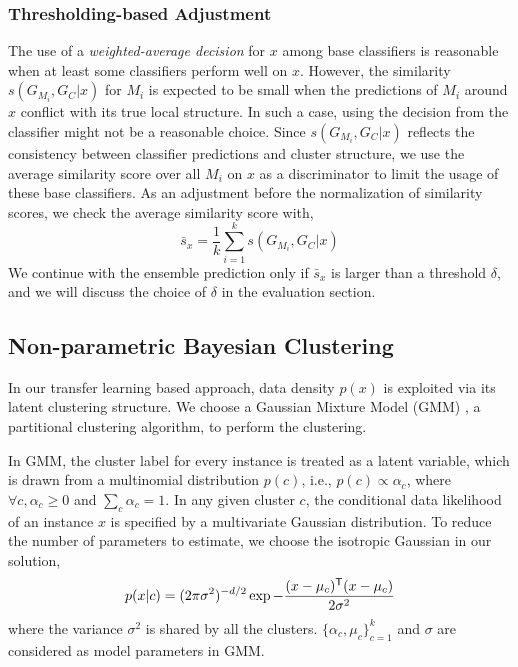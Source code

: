 \subsubsection{Thresholding-based Adjustment}
The use of a \emph{weighted-average decision} for $x$ among base classifiers is reasonable when at least some classifiers perform well on $x$.
However, the similarity $s(G_{M_i}, G_C|x)$ for $M_i$ is expected to be small when the predictions of $M_i$ around $x$ conflict with its true local structure.
In such a case, using the decision from the classifier might not be a reasonable choice.
Since $s(G_{M_i}, G_C|x)$ reflects the consistency between classifier predictions and cluster structure, we use the average similarity score over all $M_i$ on $x$ as a discriminator to limit the usage of these base classifiers.
As an adjustment before the normalization of similarity scores, we check the average similarity score with,
\begin{equation}\label{ave_sim}
 \bar s_x = \frac {1}{k}\sum_{i=1}^k s(G_{M_i}, G_C|x)
\end{equation}
We continue with the ensemble prediction only if $\bar s_x$ is larger than a threshold $\delta$, and we will discuss the choice of $\delta$ in the evaluation section.


\subsection{Non-parametric Bayesian Clustering}
\label{sec_clustering}
In our transfer learning based approach, data density $p(x)$ is exploited via its latent clustering structure. We choose a Gaussian Mixture Model (GMM) \cite{zivkovic2004improved}, a partitional clustering algorithm, to perform the clustering.

In GMM, the cluster label for every instance is treated as a latent variable, which is drawn from a multinomial distribution $p(c)$, i.e., $p(c)\propto\alpha_c$, where $\forall c, \alpha_c\ge0$ and $\sum_c\alpha_c=1$. In any given cluster $c$, the conditional data likelihood of an instance $x$ is specified by a multivariate Gaussian distribution. To reduce the number of parameters to estimate, we choose the isotropic Gaussian in our solution,
\begin{equation}
p(x|c)=(2\pi\sigma^2)^{-d/2}\exp{-\frac{(x-\mu_c)^{\mathsf{T}}(x-\mu_c)}{2\sigma^2}}
\end{equation}
where the variance $\sigma^2$ is shared by all the clusters. $\{\alpha_c, \mu_c\}^k_{c=1}$ and $\sigma$ are considered as model parameters in GMM.

